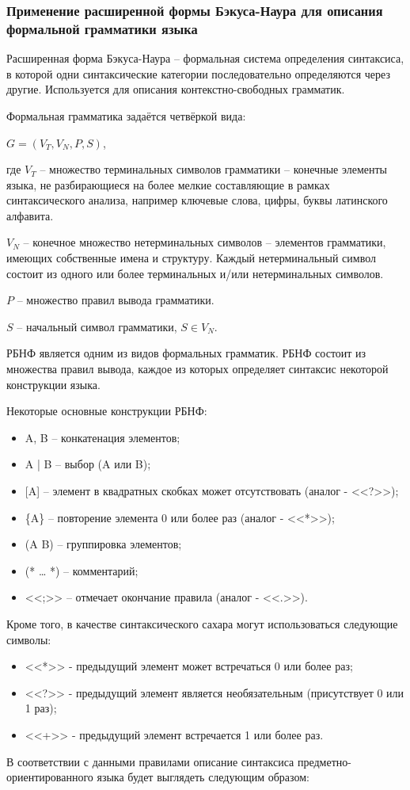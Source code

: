 \subsubsection{Применение расширенной формы Бэкуса-Наура для описания формальной грамматики языка}

Расширенная форма Бэкуса-Наура – формальная система определения синтаксиса,
в которой одни синтаксические категории последовательно определяются через другие.
Используется для описания контекстно-свободных грамматик.

Формальная грамматика задаётся четвёркой вида:

\(G = (V_T, V_N, P, S)\),

где \(V_T\) -- множество терминальных символов грамматики – конечные
элементы языка, не разбирающиеся на более мелкие составляющие в рамках
синтаксического анализа, например ключевые слова, цифры, буквы
латинского алфавита.

\(V_N\) -- конечное множество нетерминальных символов – элементов грамматики, имеющих собственные имена и структуру.
Каждый нетерминальный символ состоит из одного или более терминальных и/или нетерминальных символов.

\(P\) -- множество правил вывода грамматики.

\(S\) -- начальный символ грамматики, \(S \in V_N\).

РБНФ является одним из видов формальных грамматик.
РБНФ состоит из множества правил вывода, каждое из которых определяет синтаксис некоторой конструкции языка.

Некоторые основные конструкции РБНФ:

\begin{itemize}
    \item A, B -- конкатенация элементов;
    \item A | B -- выбор (A или B);
    \item {[A]} -- элемент в квадратных скобках может отсутствовать (аналог - <<?>>);
    \item \{A\} -- повторение элемента 0 или более раз (аналог - <<*>>);
    \item (A B) -- группировка элементов;
    \item (* … *) – комментарий;
    \item <<;>> – отмечает окончание правила (аналог - <<.>>).
\end{itemize}

Кроме того, в качестве синтаксического сахара могут использоваться следующие символы:

\begin{itemize}
    \item <<*>> - предыдущий элемент может встречаться 0 или более раз;
    \item <<?>> - предыдущий элемент является необязательным (присутствует 0 или 1 раз);
    \item <<+>> - предыдущий элемент встречается 1 или более раз.
\end{itemize}

В соответствии с данными правилами описание синтаксиса предметно-ориентированного языка будет выглядеть следующим образом:
